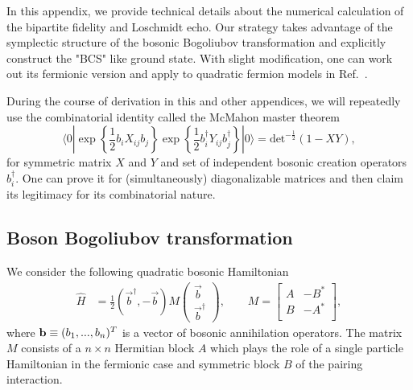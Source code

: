 
In this appendix, we provide technical details about the numerical calculation of the bipartite fidelity and Loschmidt echo.  Our strategy takes advantage of the symplectic structure of the bosonic Bogoliubov transformation and explicitly construct the "BCS" like ground state. With slight modification\cite{blaizot_quantum_1986}, one can work out its fermionic version and apply to quadratic fermion models in Ref.~.

During the course of derivation in this and other appendices, we will repeatedly use the combinatorial identity called the McMahon master theorem
\begin{equation}
\label{eq:bosonic_McMahon}
\langle0|\exp\left\{\frac{1}{2}b_iX_{ij}b_j\right\}\exp\left\{\frac{1}{2}b^\dagger_iY_{ij}b^\dagger_j\right\}|0\rangle=\text{det}^{-\frac{1}{2}}(1-XY),
\end{equation}
for symmetric matrix $X$ and $Y$ and set of independent bosonic creation operators $b_i^{\dagger}$. One can prove it for (simultaneously) diagonalizable matrices and then claim its legitimacy for its combinatorial nature. 

\subsection{Boson Bogoliubov transformation}
\label{app_sub:boson_BdG}
We consider the following quadratic bosonic Hamiltonian
\begin{equation}
\begin{aligned}
\label{eq:quadratic_boson_H}
\hat{H} &= \frac{1}{2} (\vec{b}^{\dagger}, -\vec{b}) M 
\begin{pmatrix}
\vec{b}\\
\vec{b}^{\dagger} 
\end{pmatrix},  \qquad 
M = 
\begin{bmatrix}
A & -B^* \\
B & -A^* \\
\end{bmatrix},
\end{aligned}
\end{equation}
where ${\bf b}\equiv(b_{1},...,b_{n})^T$ is a vector of bosonic annihilation operators. The matrix $M$ consists of a $n\times n$ Hermitian block $A$ which plays the role of a single particle Hamiltonian in the fermionic case and symmetric block $B$ of the pairing interaction. 

